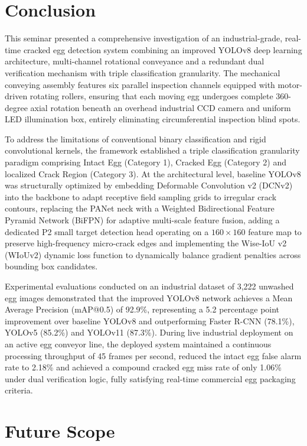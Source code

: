 \documentclass[12pt,a4paper]{report}
\begin{document}
\section{Conclusion}

This seminar presented a comprehensive investigation of an industrial-grade, real-time cracked egg detection system combining an improved YOLOv8 deep learning architecture, multi-channel rotational conveyance and a redundant dual verification mechanism with triple classification granularity. The mechanical conveying assembly features six parallel inspection channels equipped with motor-driven rotating rollers, ensuring that each moving egg undergoes complete 360-degree axial rotation beneath an overhead industrial CCD camera and uniform LED illumination box, entirely eliminating circumferential inspection blind spots.

To address the limitations of conventional binary classification and rigid convolutional kernels, the framework established a triple classification granularity paradigm comprising Intact Egg (Category 1), Cracked Egg (Category 2) and localized Crack Region (Category 3). At the architectural level, baseline YOLOv8 was structurally optimized by embedding Deformable Convolution v2 (DCNv2) into the backbone to adapt receptive field sampling grids to irregular crack contours, replacing the PANet neck with a Weighted Bidirectional Feature Pyramid Network (BiFPN) for adaptive multi-scale feature fusion, adding a dedicated P2 small target detection head operating on a $160 \times 160$ feature map to preserve high-frequency micro-crack edges and implementing the Wise-IoU v2 (WIoUv2) dynamic loss function to dynamically balance gradient penalties across bounding box candidates.

Experimental evaluations conducted on an industrial dataset of 3,222 unwashed egg images demonstrated that the improved YOLOv8 network achieves a Mean Average Precision (mAP@0.5) of 92.9\%, representing a 5.2 percentage point improvement over baseline YOLOv8 and outperforming Faster R-CNN (78.1\%), YOLOv5 (85.2\%) and YOLOv11 (87.3\%). During live industrial deployment on an active egg conveyor line, the deployed system maintained a continuous processing throughput of 45 frames per second, reduced the intact egg false alarm rate to 2.18\% and achieved a compound cracked egg miss rate of only 1.06\% under dual verification logic, fully satisfying real-time commercial egg packaging criteria.

\section{Future Scope}
\end{document}
